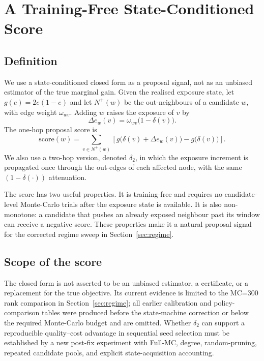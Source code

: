 \section{A Training-Free State-Conditioned Score}
\label{sec:analysis}

\subsection{Definition}

We use a state-conditioned closed form as a proposal signal, not as an unbiased estimator of the
true marginal gain.  Given the realised exposure state, let $g(e)=2e(1-e)$ and let
$N^+(w)$ be the out-neighbours of a candidate $w$, with edge weight $\omega_{wv}$.  Adding $w$
raises the exposure of $v$ by
\begin{equation}
  \Delta e_w(v) = \omega_{wv}\bigl(1-\delta(v)\bigr).
  \label{eq:delta-e}
\end{equation}
The one-hop proposal score is
\begin{equation}
  \mathrm{score}(w) = \sum_{v\in N^+(w)}
  \left[g\bigl(\delta(v)+\Delta e_w(v)\bigr)-g\bigl(\delta(v)\bigr)\right].
  \label{eq:score}
\end{equation}
We also use a two-hop version, denoted $\delta_2$, in which the exposure increment is propagated
once through the out-edges of each affected node, with the same $(1-\delta(\cdot))$ attenuation.

The score has two useful properties.  It is training-free and requires no candidate-level
Monte-Carlo trials after the exposure state is available.  It is also non-monotone: a candidate
that pushes an already exposed neighbour past its window can receive a negative score.  These
properties make it a natural proposal signal for the corrected regime sweep in
Section~\ref{sec:regime}.

\subsection{Scope of the score}

The closed form is not asserted to be an unbiased estimator, a certificate, or a replacement for
the true objective.  Its current evidence is limited to the MC=300 rank comparison in
Section~\ref{sec:regime}; all earlier calibration and policy-comparison tables were produced
before the state-machine correction or below the required Monte-Carlo budget and are omitted.
Whether $\delta_2$ can support a reproducible quality--cost advantage in sequential seed selection
must be established by a new post-fix experiment with Full-MC, degree, random-pruning, repeated
candidate pools, and explicit state-acquisition accounting.
